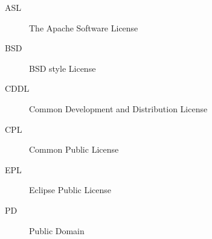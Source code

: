 \begin{description}
\item[ASL] The Apache Software License
\item[BSD] BSD style License
\item[CDDL] Common Development and Distribution License
\item[CPL] Common Public License
\item[EPL] Eclipse Public License
\item[PD] Public Domain
\end{description}
